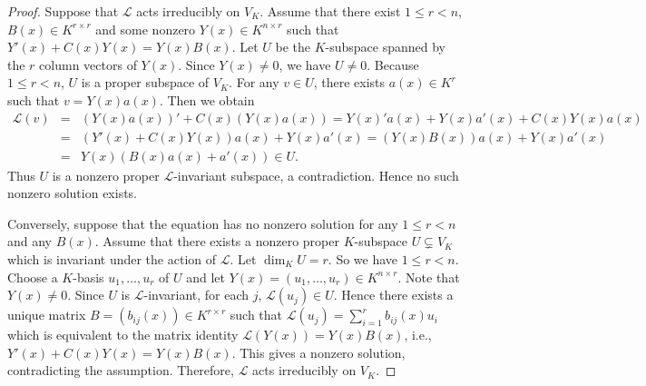\documentclass[12pt]{amsart}
\begin{document}
\begin{proof}
Suppose that $\mathcal{L}$  acts irreducibly on $V_K$. Assume that there exist $1\leq r<n$, $B(x)\in K^{r\times r}$ and some nonzero $Y(x)\in K^{n\times r}$ such that $Y'(x)+C(x)Y(x)=Y(x)B(x)$. Let $U$ be the $K$-subspace spanned by the $r$ column vectors of $Y(x)$. Since $Y(x)\neq 0$, we have $U\neq 0$. Because $1\leq r<n$, $U$ is a proper subspace of $V_K$. For any $v \in U$, there exists $a(x) \in K^r$ such that $v = Y(x)a(x)$. Then we obtain
\begin{eqnarray*}
\mathcal{L}(v) &=& (Y(x)a(x))' + C(x)(Y(x)a(x)) = Y(x)'a(x) + Y(x)a'(x) + C(x) Y(x)a(x)\\
&=&(Y'(x) + C(x)Y(x))a(x) + Y(x)a'(x) = (Y(x)B(x))a(x) + Y(x)a'(x)\\
& =& Y(x)(B(x)a(x) + a'(x)) \in U.
\end{eqnarray*}
Thus $U$ is a nonzero proper $\mathcal{L}$-invariant subspace, a contradiction. Hence no such nonzero solution exists.

Conversely, suppose that the equation has no nonzero solution for any $1 \le r < n$ and any $B(x)$. Assume that there exists a nonzero proper $K$-subspace $U \subsetneq V_K$ which is invariant under the action of $\mathcal{L}$. Let $\dim_K U = r$. So we have $1 \le r < n$. Choose a $K$-basis $u_1,\dots,u_r$ of $U$ and let $Y(x) = (u_1,\dots,u_r) \in K^{n \times r}$. Note that $Y(x)\neq 0$. Since $U$ is $\mathcal L$-invariant, for each $j$, $\mathcal{L}(u_j) \in U$. Hence there exists a unique matrix $B = (b_{ij}(x)) \in K^{r \times r}$ such that $\mathcal{L}(u_j) = \sum_{i=1}^r b_{ij}(x) u_i$ which is equivalent to the matrix identity $\mathcal{L}(Y(x)) = Y(x)B(x)$, i.e., $Y'(x) + C(x)Y(x) = Y(x)B(x)$.
This gives a nonzero solution, contradicting the assumption. Therefore, $\mathcal{L}$  acts irreducibly on $V_K$.

\end{proof}
\end{document}
